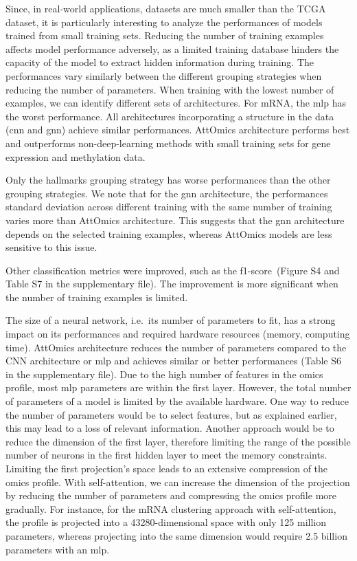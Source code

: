 \documentclass[../main.tex]{subfiles}
\begin{document}
Since, in real-world applications, datasets are much smaller than the TCGA dataset, it is particularly interesting to analyze the performances of models trained from small training sets.
Reducing the number of training examples affects model performance adversely, as a limited training database hinders the capacity of the model to extract hidden information during training.
The performances vary similarly between the different grouping strategies when reducing the number of parameters.
When training with the lowest number of examples, we can identify different sets of architectures.
For mRNA, the \gls{mlp} has the worst performance.
All architectures incorporating a structure in the data (\gls{cnn} and \gls{gnn}) achieve similar performances.
AttOmics architecture performs best and outperforms non-deep-learning methods with small training sets for gene expression and methylation data.

Only the hallmarks grouping strategy has worse performances than the other grouping strategies.
We note that for the \gls{gnn} architecture, the performances standard deviation across different training with the same number of training varies more than AttOmics architecture.
This suggests that the \gls{gnn} architecture depends on the selected training examples, whereas AttOmics models are less sensitive to this issue.

Other classification metrics were improved, such as the f1-score~(Figure S4 and Table S7 in the supplementary file).
The improvement is more significant when the number of training examples is limited.

The size of a neural network, i.e.\ its number of parameters to fit, has a strong impact on its performances and required hardware resources (memory, computing time).
AttOmics architecture reduces the number of parameters compared to the CNN architecture or \gls{mlp} and achieves similar or better performances (Table S6 in the supplementary file).
Due to the high number of features in the omics profile, most \gls{mlp} parameters are within the first layer.
However, the total number of parameters of a model is limited by the available hardware.
One way to reduce the number of parameters would be to select features, but as explained earlier, this may lead to a loss of relevant information.
Another approach would be to reduce the dimension of the first layer, therefore limiting the range of the possible number of neurons in the first hidden layer to meet the memory constraints.
Limiting the first projection's space leads to an extensive compression of the omics profile.
With self-attention, we can increase the dimension of the projection by reducing the number of parameters and compressing the omics profile more gradually.
For instance, for the mRNA clustering approach with self-attention, the profile is projected into a 43280-dimensional space with only 125 million parameters, whereas projecting into the same dimension would require 2.5 billion parameters with an \gls{mlp}.
\end{document}
